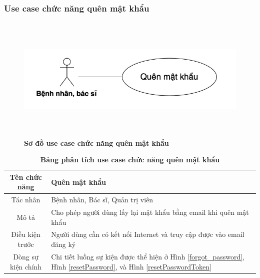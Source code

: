 \subsubsection{Use case chức năng quên mật khẩu}
  \begin{figure}[H]
    \centering
    \includegraphics[width=15cm,height=6cm]{Images/use_case/use_case_forgot_password.png}
    \caption[Sơ đồ use case chức năng quên mật khẩu]{\bfseries \fontsize{12pt}{0pt}
    \selectfont Sơ đồ use case chức năng quên mật khẩu}
    \label{use_case_forgot_password} %
  \end{figure}

  \begin{table}[H]
    \caption{\bfseries \fontsize{12pt}{0pt}\selectfont Bảng phân tích use case chức năng quên mật khẩu}
    \centering
    \begin{tabularx}{0.9\textwidth}{|c|X|}
      \hline
      \textbf{Tên chức năng} & \textbf{Quên mật khẩu} \\
      \hline
      Tác nhân & Bệnh nhân, Bác sĩ, Quản trị viên \\
      \hline
      Mô tả & Cho phép người dùng lấy lại mật khẩu bằng email khi quên mật khẩu \\
      \hline
      Điều kiện trước & Người dùng cần có kết nối Internet và truy cập được vào email đăng ký \\
      \hline
      Dòng sự kiện chính & 
        Chi tiết luồng sự kiện được thể hiện ở Hình \ref{forgot_password}, Hình \ref{resetPassword}, và Hình \ref{resetPasswordToken}\\
      \hline
    \end{tabularx}
  \end{table}

